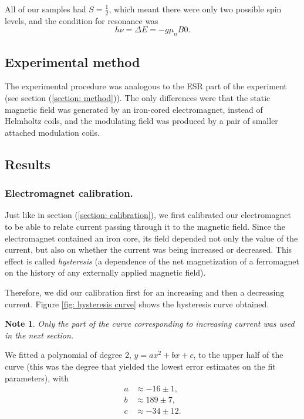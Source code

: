 \documentclass[a4paper]{jpconf}
\numberwithin{equation}{section}
\newtheorem*{note}{Note}
\begin{document}
All of our samples had $S = \tfrac{1}{2}$, which meant there were only two possible spin levels, and the condition for resonance was 
\begin{equation}\label{eqn: NMR resonance condition}
	h\nu = \Delta E = -g \mu_n B0.
\end{equation}


\subsection{Experimental method}
The experimental procedure was analogous to the ESR part of the experiment (see section (\ref{section: method})). The only differences were that the static magnetic field was generated by an iron-cored electromagnet, instead of Helmholtz coils, and the modulating field was produced by a pair of smaller attached modulation coils.


\subsection{Results}
\subsubsection{Electromagnet calibration.}
Just like in section (\ref{section: calibration}), we first calibrated our electromagnet to be able to relate current passing through it to the magnetic field.
Since the electromagnet contained an iron core, its field depended not only the value of the current, but also on whether the current was being increased or decreased. This effect is called \emph{hysteresis} (a dependence of the net magnetization of a ferromagnet on the history of any externally applied magnetic field). 

Therefore, we did our calibration first for an increasing and then a decreasing current. Figure \ref{fig: hysteresis curve} shows the hysteresis curve obtained.
\begin{note}
	Only the part of the curve corresponding to increasing current was used in the next section.
\end{note}
We fitted a polynomial of degree $2$, $y = ax^2 + bx + c$, to the upper half of the curve (this was the degree that yielded the lowest error estimates on the fit parameters), with
\begin{align*}
	a &\approx -16 \pm 1, \\
	b &\approx 189 \pm 7, \\
	c &\approx -34 \pm 12.
\end{align*}
\end{document}
